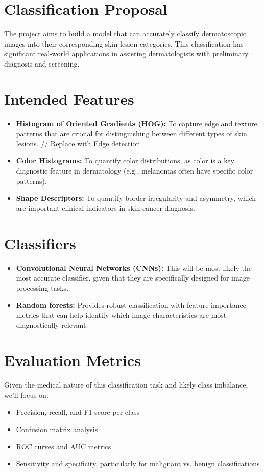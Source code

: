 \documentclass{article}
\begin{document}
\section{Classification Proposal}

The project aims to build a model that can accurately classify dermatoscopic images into their corresponding skin lesion categories. This classification has significant real-world applications in assisting dermatologists with preliminary diagnosis and screening.

\section{Intended Features}
\begin{itemize}
    \item \textbf{Histogram of Oriented Gradients (HOG):} To capture edge and texture patterns that are crucial for distinguishing between different types of skin lesions. // Replace with Edge detection
    \item \textbf{Color Histograms:} To quantify color distributions, as color is a key diagnostic feature in dermatology (e.g., melanomas often have specific color patterns).
    \item \textbf{Shape Descriptors:} To quantify border irregularity and asymmetry, which are important clinical indicators in skin cancer diagnosis.
\end{itemize}

\section{Classifiers}
\begin{itemize}
    \item \textbf{Convolutional Neural Networks (CNNs):} This will be most likely the most accurate classifier, given that they are specifically designed for image processing tasks.
    \item \textbf{Random forests:} Provides robust classification with feature importance metrics that can help identify which image characteristics are most diagnostically relevant.
\end{itemize}

\section{Evaluation Metrics}

Given the medical nature of this classification task and likely class imbalance, we'll focus on:
\begin{itemize}
    \item Precision, recall, and F1-score per class
    \item Confusion matrix analysis
    \item ROC curves and AUC metrics
    \item Sensitivity and specificity, particularly for malignant vs. benign classifications
\end{itemize}
\end{document}
